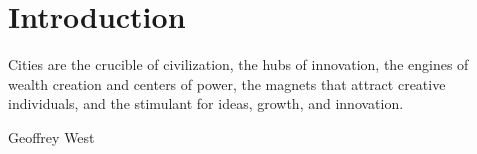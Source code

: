 \chapter{Introduction} \label{chapter-introduction}

\epigraph{Cities are the crucible of civilization, the hubs of innovation, the engines of wealth creation and centers of power, the magnets that attract creative individuals, and the stimulant for ideas, growth, and innovation.}{Geoffrey West \cite{westScaleUniversalLaws2017}}
% 



